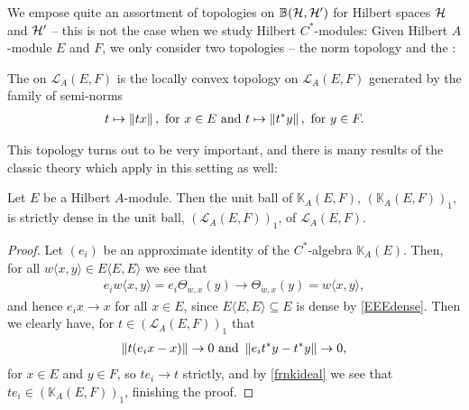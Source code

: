 We empose quite an assortment of topologies on $\mathbb{B}(\mathcal{H},\mathcal{H}')$ for Hilbert spaces $\mathcal{H}$ and $\mathcal{H}'$ -- this is not the case when we study Hilbert $C^*$-modules: Given Hilbert $A$-module $E$ and $F$, we only consider two topologies -- the norm topology and the :
\begin{definition}
	The  on $\mathcal{L}_A(E,F)$ is the locally convex topology on $\mathcal{L}_A(E,F)$ generated by the family of semi-norms 
	\begin{align*}
		t \mapsto \left\lVert tx\right\rVert, \text{ for } x \in E \text{ and }		t \mapsto \left\lVert t^*y \right\rVert, \text{ for } y \in F.
	\end{align*}
\end{definition}
This topology turns out to be very important, and there is many results of the classic theory which apply in this setting as well:
\begin{proposition}
	Let $E$ be a Hilbert $A$-module. Then the unit ball of $\mathbb{K}_A(E,F)$, $(\mathbb{K}_A(E,F))_1$, is strictly dense in the unit ball, $(\mathcal{L}_A(E,F))_1$, of $\mathcal{L}_A(E,F)$.
	\label{mult:unitstrictdense}
\end{proposition}
\begin{proof}
	Let $(e_i)$ be an approximate identity of the $C^*$-algebra $\mathbb{K}_A(E)$. Then, for all $w\langle x,y \rangle \in E\langle E,E \rangle$ we see that
	\begin{align*}
		e_i w\langle x,y \rangle = e_i \Theta_{w,x}(y) \to \Theta_{w,x}(y) = w \langle x,y\rangle,
	\end{align*}
	and hence $e_i x \to x$ for all $x \in E$, since $E\langle E,E\rangle \subseteq E$ is dense by \ref{EEEdense}. Then we clearly have, for $t \in (\mathcal{L}_A(E,F))_1$ that
	\begin{align*}
		\left\lVert t(e_ix-x)\right\rVert \to 0 \text{  and  } \left\lVert e_it^*y-t^*y\right\rVert \to 0,
	\end{align*}
	for $x \in E$ and $y \in F$, so $te_i \to t$ strictly, and by \ref{frnkideal} we see that $te_i \in (\mathbb{K}_A(E,F))_1$, finishing the proof.
\end{proof}


